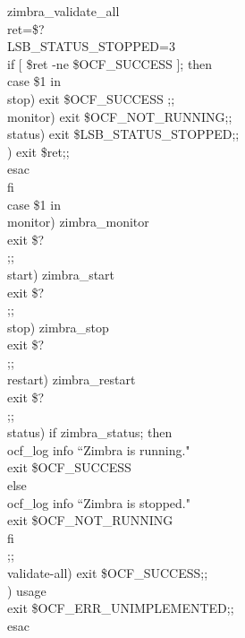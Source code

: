 \documentclass[a4paper, 12pt]{book}
\begin{document}
\noindent zimbra\_validate\_all\\
ret=\$?\\

\noindent LSB\_STATUS\_STOPPED=3\\
if [ \$ret -ne \$OCF\_SUCCESS ]; then\\
    \indent case \$1 in\\
    \indent \indent stop)       exit \$OCF\_SUCCESS ;;\\
    \indent \indent monitor)    exit \$OCF\_NOT\_RUNNING;;\\
    \indent \indent status)     exit \$LSB\_STATUS\_STOPPED;;\\
    \indent \indent *)          exit \$ret;;\\
    \indent esac\\
fi\\

\noindent case \$1 in\\
    \indent monitor)    zimbra\_monitor\\
                \indent \indent exit \$?\\
                \indent \indent ;;\\
    \indent start)      zimbra\_start\\
                \indent \indent exit \$?\\
                \indent \indent ;;\\

    \indent stop)       zimbra\_stop\\
                \indent \indent exit \$?\\
                \indent \indent ;;\\

    \indent restart)     zimbra\_restart\\
                \indent \indent exit \$?\\
                \indent \indent ;;\\

    \indent status)     if zimbra\_status; then\\
                    \indent \indent \indent \indent ocf\_log info ``Zimbra is running."\\
                    \indent \indent \indent \indent exit \$OCF\_SUCCESS\\
                \indent \indent \indent else\\
                    \indent \indent \indent \indent ocf\_log info ``Zimbra is stopped."\\
                    \indent \indent \indent \indent exit \$OCF\_NOT\_RUNNING\\
                \indent \indent \indent fi\\
                \indent \indent \indent ;;\\

    \indent validate-all)   exit \$OCF\_SUCCESS;;\\

    \indent *)          usage\\
                \indent \indent exit \$OCF\_ERR\_UNIMPLEMENTED;;\\
esac
\end{document}
